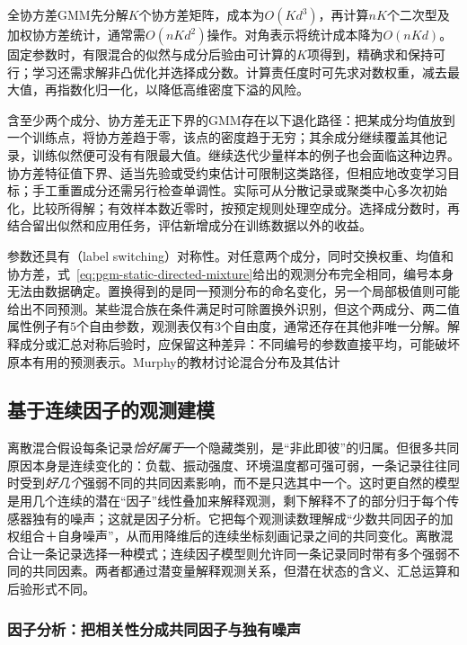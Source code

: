 全协方差GMM先分解$K$个协方差矩阵，成本为$O(Kd^3)$，再计算$nK$个二次型及加权协方差统计，通常需$O(nKd^2)$操作。对角表示将统计成本降为$O(nKd)$。固定参数时，有限混合的似然与成分后验由可计算的$K$项得到，精确求和保持可行；学习还需求解非凸优化并选择成分数。计算责任度时可先求对数权重，减去最大值，再指数化归一化，以降低高维密度下溢的风险。

含至少两个成分、协方差无正下界的GMM存在以下退化路径：把某成分均值放到一个训练点，将协方差趋于零，该点的密度趋于无穷；其余成分继续覆盖其他记录，训练似然便可没有有限最大值。继续迭代少量样本的例子也会面临这种边界。协方差特征值下界、适当先验或受约束估计可限制这类路径，但相应地改变学习目标；手工重置成分还需另行检查单调性。实际可从分散记录或聚类中心多次初始化，比较所得解；有效样本数近零时，按预定规则处理空成分。选择成分数时，再结合留出似然和应用任务，评估新增成分在训练数据以外的收益。

参数还具有（label switching）对称性。对任意两个成分，同时交换权重、均值和协方差，式~\eqref{eq:pgm-static-directed-mixture}给出的观测分布完全相同，编号本身无法由数据确定。置换得到的是同一预测分布的命名变化，另一个局部极值则可能给出不同预测。某些混合族在条件满足时可除置换外识别，但这个两成分、两二值属性例子有$5$个自由参数，观测表仅有$3$个自由度，通常还存在其他非唯一分解。解释成分或汇总对称后验时，应保留这种差异：不同编号的参数直接平均，可能破坏原本有用的预测表示。Murphy的教材讨论混合分布及其估计

\subsection{基于连续因子的观测建模}
\label{sec:pgm-static-directed-linear-gaussian}

离散混合假设每条记录\emph{恰好属于}一个隐藏类别，是“非此即彼”的归属。但很多共同原因本身是连续变化的：负载、振动强度、环境温度都可强可弱，一条记录往往同时受到\emph{好几个}强弱不同的共同因素影响，而不是只选其中一个。这时更自然的模型是用几个连续的潜在“因子”线性叠加来解释观测，剩下解释不了的部分归于每个传感器独有的噪声；这就是因子分析。它把每个观测读数理解成“少数共同因子的加权组合＋自身噪声”，从而用降维后的连续坐标刻画记录之间的共同变化。离散混合让一条记录选择一种模式；连续因子模型则允许同一条记录同时带有多个强弱不同的共同因素。两者都通过潜变量解释观测关系，但潜在状态的含义、汇总运算和后验形式不同。

\subsubsection{因子分析：把相关性分成共同因子与独有噪声}
\label{sec:pgm-static-directed-fa-model}

